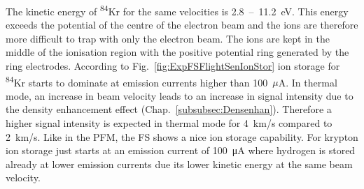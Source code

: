 		The kinetic energy of \textsuperscript{84}Kr for the same velocities is 2.8~--~11.2~eV. This energy exceeds the potential of the centre of the electron beam and the ions are therefore more difficult to trap with only the electron beam. The ions are kept in the middle of the ionisation region with the positive potential ring generated by the ring electrodes. According to Fig.~\ref{fig:ExpFSFlightSenIonStor} ion storage for \textsuperscript{84}Kr starts to dominate at emission currents higher than 100~$\mu$A. In thermal mode, an increase in beam velocity leads to an increase in signal intensity due to the density enhancement effect (Chap.~\ref{subsubsec:Densenhan}). Therefore a higher signal intensity is expected in thermal mode for 4~km/s compared to 2~km/s. Like in the PFM, the FS shows a nice ion storage capability. For krypton ion storage just starts at an emission current of 100~\si{\micro\ampere} where hydrogen is stored already at lower emission currents due its lower kinetic energy at the same beam velocity.\\
		
